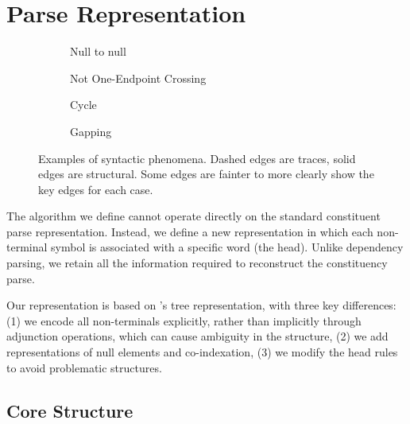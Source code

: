 \section{Parse Representation}

\begin{figure}
\hfill
\begin{subfigure}[b]{0.39\textwidth}
  \centering
  \scalebox{0.8}{}
  \caption{\label{fig:null-null}
    Null to null
  }
\end{subfigure}
\hfill
\begin{subfigure}[b]{0.5\textwidth}
  \centering
  \scalebox{0.8}{}
  \caption{\label{fig:not-1ec}
    Not One-Endpoint Crossing
  }
\end{subfigure}
\hfill
\strut

\vspace{5mm}
\hfill
\begin{subfigure}[b]{0.33\textwidth}
  \centering
  \scalebox{0.8}{}
  \caption{\label{fig:cycle}
    Cycle
  }
\end{subfigure}
\hfill
\begin{subfigure}[b]{0.46\textwidth}
  \centering
  \scalebox{0.8}{}
  \caption{\label{fig:gapping}
    Gapping
  }
\end{subfigure}
\hfill
\strut
\caption[Examples of graph structured syntactic phenomena.]{
Examples of syntactic phenomena.
Dashed edges are traces, solid edges are structural.
Some edges are fainter to more clearly show the key edges for each case.
}
\end{figure}

The algorithm we define cannot operate directly on the standard constituent parse representation.
Instead, we define a new representation in which each non-terminal symbol is associated with a specific word (the head).
Unlike dependency parsing, we retain all the information required to reconstruct the constituency parse.

Our representation is based on \textcite{cck}'s tree representation, with three key differences:
(1) we encode all non-terminals explicitly, rather than implicitly through adjunction operations, which can cause ambiguity in the structure,
(2) we add representations of null elements and co-indexation,
(3) we modify the head rules to avoid problematic structures.

\subsection{Core Structure} \label{sec:rep-core}

